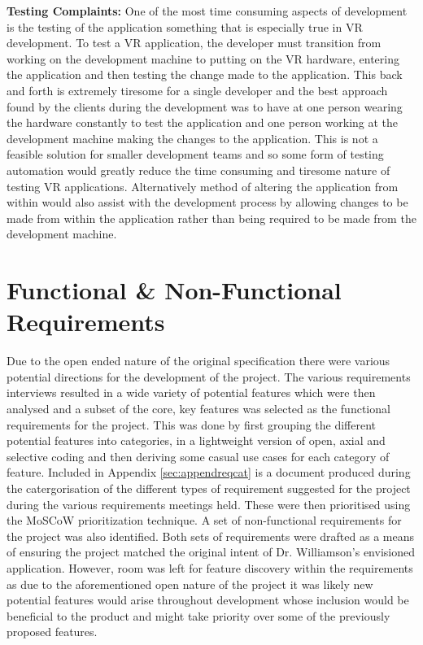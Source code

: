 \documentclass{l4proj}
\begin{document}
\textbf{Testing Complaints:}
One of the most time consuming aspects of development is the testing of the application something that is especially true in VR development. To test a VR application, the developer must transition from working on the development machine to putting on the VR hardware, entering the application and then testing the change made to the application. This back and forth is extremely tiresome for a single developer and the best approach found by the clients during the development was to have at one person wearing the hardware constantly to test the application and one person working at the development machine making the changes to the application. This is not a feasible solution for smaller development teams and so some form of testing automation would greatly reduce the time consuming and tiresome nature of testing VR applications. Alternatively method of altering the application from within would also assist with the development process by allowing changes to be made from within the application rather than being required to be made from the development machine. 

\section{Functional \& Non-Functional Requirements}
\label{sec:requirementsfunctionalnonfunctional}
Due to the open ended nature of the original specification there were various potential directions for the development of the project. The various requirements interviews resulted in a wide variety of potential features which were then analysed and a subset of the core, key features was selected as the functional requirements for the project. This was done by first grouping the different potential features into categories, in a lightweight version of open, axial and selective coding \cite{openaxebook} and then deriving some casual use cases \cite{usecases} for each category of feature. Included in Appendix \ref{sec:appendreqcat} is a document produced during the catergorisation of the different types of requirement suggested for the project during the various requirements meetings held. These were then prioritised using the MoSCoW prioritization technique. A set of non-functional requirements for the project was also identified. Both sets of requirements were drafted as a means of ensuring the project matched the original intent of Dr. Williamson’s envisioned application. However, room was left for feature discovery within the requirements as due to the aforementioned open nature of the project it was likely new potential features would arise throughout development whose inclusion would be beneficial to the product and might take priority over some of the previously proposed features.
\end{document}
